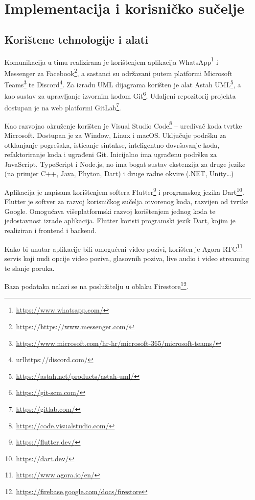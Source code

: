 \chapter{Implementacija i korisničko sučelje}
		
		
		\section{Korištene tehnologije i alati}
		
			\text Komunikacija u timu realizirana je korištenjem aplikacija WhatsApp\footnote{\url{https://www.whatsapp.com/}} i Messenger za Facebook\footnote{\url{https://https://www.messenger.com/}}, a sastanci su održavani putem platformi Microsoft Teams\footnote{\url{https://www.microsoft.com/hr-hr/microsoft-365/microsoft-teams/}} te Discord\footnote{url{https://discord.com/}}. Za izradu UML dijagrama korišten je alat Astah UML\footnote{\url{https://astah.net/products/astah-uml/}}, a kao sustav za upravljanje izvornim kodom Git\footnote{\url{https://git-scm.com/}}. Udaljeni repozitorij projekta dostupan je na web platformi GitLab\footnote{\url{https://gitlab.com/}}.
			
			Kao razvojno okruženje korišten je Visual Studio Code\footnote{\url{https://code.visualstudio.com/}} – uređivač koda tvrtke Microsoft. Dostupan je za Window, Linux i macOS. Uključuje podršku za otklanjanje pogrešaka, isticanje sintakse, inteligentno dovršavanje koda, refaktoriranje koda i ugrađeni Git. Inicijalno ima ugrađenu podršku za JavaScript, TypeScript i Node.js, no ima bogat sustav ekstenzija za druge jezike (na primjer C++, Java, Phyton, Dart) i druge radne okvire (.NET, Unity…)
			
			Aplikacija je napisana korištenjem softera Flutter\footnote{\url{https://flutter.dev/}} i programskog jezika Dart\footnote{\url{https://dart.dev/}}. Flutter je softver za razvoj korisničkog sučelja otvorenog koda, razvijen od tvrtke Google. Omogućava višeplatformski razvoj korištenjem jednog koda te jedostavnost izrade aplikacija. Flutter koristi programski jezik Dart, kojim je realiziran i frontend i backend.
			
			Kako bi unutar aplikacije bili omogućeni video pozivi, korišten je Agora RTC\footnote{\url{https://www.agora.io/en/}} servis koji nudi opcije video poziva, glasovnih poziva, live audio i video streaming te slanje poruka.
			
			Baza podataka nalazi se na poslužitelju u oblaku Firestore\footnote{\url{https://firebase.google.com/docs/firestore}}. 
			
